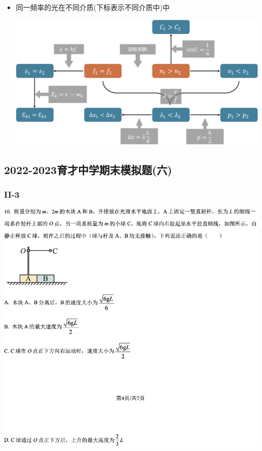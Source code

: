 \documentclass{article}
\begin{document}
\begin{itemize}
\begin{formal}
\begin{itemize}
                    \vspace*{2em}

                    \item 同一频率的光在不同介质(下标表示不同介质中)中
                    
                    \vspace*{1em}
                    \includegraphics[width=40em,keepaspectratio]{./pictures/1.3-13.png}
                \end{itemize}
            \end{formal}
        \end{itemize}


        \subsection{2022-2023育才中学期末模拟题(六)}
        \subsubsection{II-3}

        \includegraphics[width=50em,keepaspectratio]{./pictures/1.3-14.png}
\end{document}

